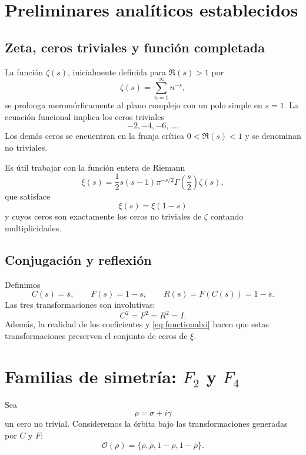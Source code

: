 \documentclass[11pt]{amsart}
\theoremstyle{definition}
\theoremstyle{remark}
\begin{document}
\section{Preliminares analíticos establecidos}
\subsection{Zeta, ceros triviales y función completada}
La función $\zeta(s)$, inicialmente definida para $\Re(s)>1$ por
\begin{equation}
  \zeta(s)=\sum_{n=1}^{\infty}n^{-s},
\end{equation}
se prolonga meromórficamente al plano complejo con un polo simple en $s=1$. La ecuación funcional implica los ceros triviales
\begin{equation}
  -2,-4,-6,\ldots.
\end{equation}
Los demás ceros se encuentran en la franja crítica $0<\Re(s)<1$ y se denominan no triviales.

Es útil trabajar con la función entera de Riemann
\begin{equation}\label{eq:xi}
 \xi(s)=\frac12 s(s-1)\pi^{-s/2}\Gamma\!\left(\frac{s}{2}\right)\zeta(s),
\end{equation}
que satisface
\begin{equation}\label{eq:functionalxi}
   \xi(s)=\xi(1-s)
\end{equation}
y cuyos ceros son exactamente los ceros no triviales de $\zeta$ contando multiplicidades.

\subsection{Conjugación y reflexión}
Definimos
\begin{equation}\label{eq:CFR}
  C(s)=\overline{s},\qquad F(s)=1-s,\qquad R(s)=F(C(s))=1-\overline{s}.
\end{equation}
Las tres transformaciones son involutivas:
\begin{equation}
 C^2=F^2=R^2=I.
\end{equation}
Además, la realidad de los coeficientes y \eqref{eq:functionalxi} hacen que estas transformaciones preserven el conjunto de ceros de $\xi$.

\section{Familias de simetría: $F_2$ y $F_4$}
Sea
\begin{equation}
 \rho=\sigma+i\gamma
\end{equation}
un cero no trivial. Consideremos la órbita bajo las transformaciones generadas por $C$ y $F$:
\begin{equation}\label{eq:orbit}
 \mathcal O(\rho)=\{\rho,\overline\rho,1-\rho,1-\overline\rho\}.
\end{equation}
\end{document}

